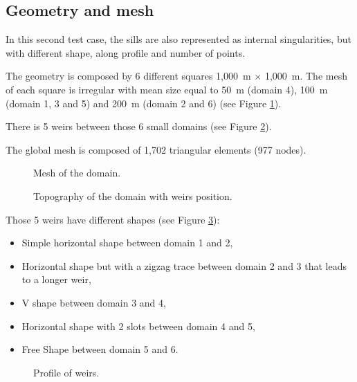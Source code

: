 \subsection{Geometry and mesh}

In this second test case, the sills are also represented as internal
singularities, but with different shape, along profile and number of points.

The geometry is composed by 6 different squares 1,000~m $\times$ 1,000~m.
The mesh of each square is irregular with mean size equal to 50~m (domain 4), 
100~m (domain 1, 3 and 5) and 200~m (domain 2 and 6) (see Figure \ref{t2d:weirs2:fig:mesh}).

There is 5 weirs between those 6 small domains
(see Figure \ref{t2d:weirs2:fig:geo}).

The global mesh is composed of 1,702 triangular elements (977 nodes).

\begin{figure}[H]
 \centering
 \caption{Mesh of the domain.}
 \label{t2d:weirs2:fig:mesh}
\end{figure}

\begin{figure}[H]
 \centering
 \caption{Topography of the domain with weirs position.}
 \label{t2d:weirs2:fig:geo}
\end{figure}

Those 5 weirs have different shapes (see Figure \ref{t2d:weirs2:fig:weirsprofile}):
\begin{itemize}
\item Simple horizontal shape between domain 1 and 2, %
\item Horizontal shape but with a zigzag trace between domain 2 and 3 
that leads to a longer weir, %
\item V shape between domain 3 and 4, %
\item Horizontal shape with 2 slots between domain 4 and 5, %
\item Free Shape between domain 5 and 6. %
\end{itemize}

\begin{figure}[!htbp]
 \hfill
 \hfill
 \centering
 \caption{Profile of weirs.}
 \label{t2d:weirs2:fig:weirsprofile}
\end{figure}


